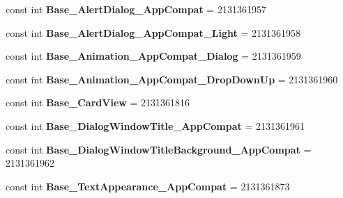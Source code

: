 \begin{DoxyCompactItemize}
\item 
\mbox{\label{class_pinned_app_1_1_droid_1_1_resource_1_1_style_a52686504d4bc445b4df8f8b930f6afac}} 
const int {\bfseries Base\+\_\+\+Alert\+Dialog\+\_\+\+App\+Compat} = 2131361957
\item 
\mbox{\label{class_pinned_app_1_1_droid_1_1_resource_1_1_style_a6585a094335517ed8fe9c1ad4eea598e}} 
const int {\bfseries Base\+\_\+\+Alert\+Dialog\+\_\+\+App\+Compat\+\_\+\+Light} = 2131361958
\item 
\mbox{\label{class_pinned_app_1_1_droid_1_1_resource_1_1_style_a96f5710d671528621f6bdad99a45a975}} 
const int {\bfseries Base\+\_\+\+Animation\+\_\+\+App\+Compat\+\_\+\+Dialog} = 2131361959
\item 
\mbox{\label{class_pinned_app_1_1_droid_1_1_resource_1_1_style_a375113a22b1be9c497e3165658d5a5f3}} 
const int {\bfseries Base\+\_\+\+Animation\+\_\+\+App\+Compat\+\_\+\+Drop\+Down\+Up} = 2131361960
\item 
\mbox{\label{class_pinned_app_1_1_droid_1_1_resource_1_1_style_a13a5ef6e6630ea2b3bbc550fa9c37761}} 
const int {\bfseries Base\+\_\+\+Card\+View} = 2131361816
\item 
\mbox{\label{class_pinned_app_1_1_droid_1_1_resource_1_1_style_a8ba2a83383a50f9373b9c92a7b348400}} 
const int {\bfseries Base\+\_\+\+Dialog\+Window\+Title\+\_\+\+App\+Compat} = 2131361961
\item 
\mbox{\label{class_pinned_app_1_1_droid_1_1_resource_1_1_style_ac6e64f3438bf5ef03791482c847b91a3}} 
const int {\bfseries Base\+\_\+\+Dialog\+Window\+Title\+Background\+\_\+\+App\+Compat} = 2131361962
\item 
\mbox{\label{class_pinned_app_1_1_droid_1_1_resource_1_1_style_a0a2774f62a709c4859fee8f6d388cded}} 
const int {\bfseries Base\+\_\+\+Text\+Appearance\+\_\+\+App\+Compat} = 2131361873

\end{DoxyCompactItemize}
